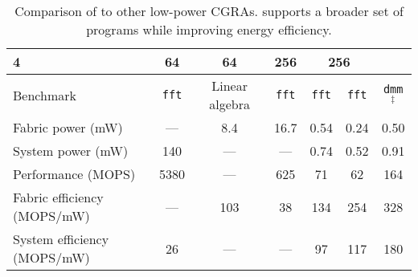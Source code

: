 {\begin{table*}[h]
{\begin{tabular}{lcccc@{\hskip 2em}cc}
        4 &
        64 &
        64 &
        256 &
        \multicolumn{2}{c}{256} \\
        \midrule
        Benchmark &
        {\tt fft} &
        Linear algebra &
        {\tt fft} &
        {\tt fft} &
        {\tt fft} & {\tt dmm$^\ddag$} \\
	Fabric power (mW) &
	--- &
	8.4 &
	16.7 &
	0.54 &
	0.24 & 0.50 \\
	System power (mW) &
	140 &
	--- &
	--- &
	0.74 &
	0.52 & 0.91\\
	Performance (MOPS) &
	5380 &
	--- &
	625 &
	71 &
	62 & 164 \\
	Fabric efficiency (MOPS/mW) &
	--- &
	103 &
	38 &
	134 &
	254 & 328 \\
	System efficiency (MOPS/mW) &
	26 &
	--- &
	--- &
	97 &
	117 & 180\\
	\bottomrule
      \end{tabular}
    }
    
    \vspace{1pt}
    
    \caption{Comparison of \riptide to other low-power CGRAs.
      \riptide supports a broader set of programs
      while improving energy efficiency.
      }
    \label{tab:riptide:eval:compare}
  \end{table*}
}

